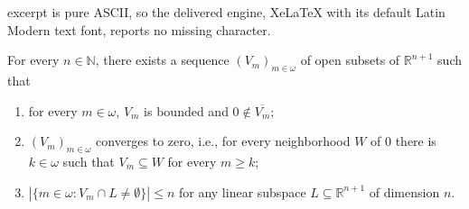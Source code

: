 \documentclass[10pt,a4paper]{amsart}
\newcommand{\IR}{\mathbb{R}}
\newcommand{\NN}{\mathbb{N}}
\newcommand{\w}{\omega}
\begin{document}
excerpt is pure ASCII, so the delivered engine, XeLaTeX with its default Latin Modern text font, reports no missing character.
\begin{lemma}\label{l:Rn+1-ls}
For every $n\in\NN$, there exists a sequence $(V_m)_{m\in \w}$ of open subsets of $\IR^{n+1}$ such that
\begin{enumerate}
\item[{\rm(i)}] for every $m\in\w$, $V_m$ is bounded and $0\not\in \overline{V_m}$;
\item[{\rm(ii)}] $(V_m)_{m\in \w}$ converges to zero, i.e., for every neighborhood $W$ of $0$ there is $k\in\w$ such that $V_m\subseteq W$ for every $m\geq k$;
\item[{\rm(iii)}] $|\{m\in\w: V_m\cap L\neq\emptyset\}|\leq n $ for any linear subspace $L\subseteq \IR^{n+1}$ of dimension $n$.
\end{enumerate}
\end{lemma}
\end{document}
